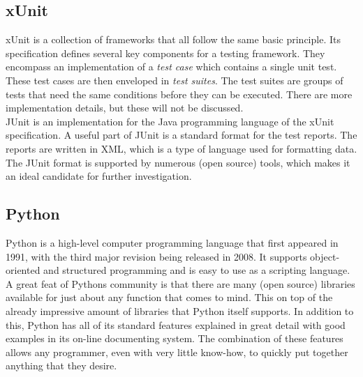 \documentclass[11pt,british]{article}
\begin{document}
\subsection{xUnit}
\label{subsec:xUnit}
xUnit is a collection of frameworks that all follow the same basic principle. Its specification defines several key components for a testing framework. They encompass an implementation of a \emph{test case} which contains a single unit test. These test cases are then enveloped in \emph{test suites}. The test suites are groups of tests that need the same conditions before they can be executed. There are more implementation details, but these will not be discussed.\cite{xunit2}
\\[\baselineskip]
JUnit is an implementation for the Java programming language of the xUnit specification. A useful part of JUnit is a standard format for the test reports. The reports are written in \gls{XML}, which is a type of language used for formatting data. The JUnit format is supported by numerous (open source) tools, which makes it an ideal candidate for further investigation.\cite{xunit,junitxml,junit}

\subsection{Python}
Python is a high-level computer programming language that first appeared in 1991, with the third major revision being released in 2008. It supports object-oriented and structured programming and is easy to use as a scripting language. A great feat of Pythons community is that there are many (open source) libraries available for just about any function that comes to mind. This on top of the already impressive amount of libraries that Python itself supports. In addition to this, Python has all of its standard features explained in great detail with good examples in its on-line documenting system. The combination of these features allows any programmer, even with very little know-how, to quickly put together anything that they desire.\cite{python1}

\end{document}

